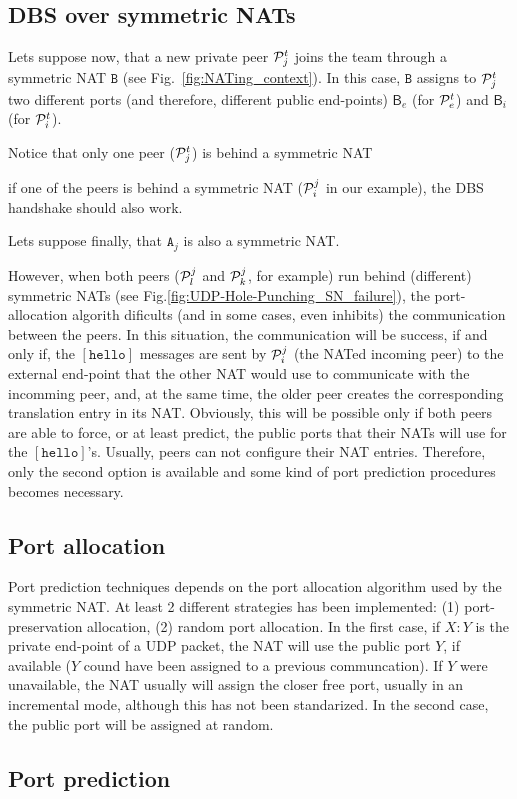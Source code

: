 




\subsection{DBS over symmetric NATs}


Lets suppose now, that a new private peer ${\cal P}^t_j$ joins the
team through a symmetric NAT $\mathtt{B}$ (see
Fig.~\ref{fig:NATing_context}). In this case, $\mathtt{B}$ assigns
to ${\cal P}^t_j$ two different ports (and therefore, different
public end-points) $\mathsf{B}_e$ (for ${\cal P}^t_e$) and
$\mathsf{B}_i$ (for ${\cal P}^t_i$).

Notice that only one peer (${\cal P}^t_j$) is behind a symmetric NAT

if one of the peers is
behind a symmetric NAT (${\cal P}^j_i$ in our example), the DBS
handshake should also work.

Lets suppose finally, that $\mathtt{A}_j$ is also a symmetric NAT.

 However, when both peers (${\cal P}^j_l$ and
${\cal P}^j_k$, for example) run behind (different) symmetric NATs
(see Fig.\ref{fig:UDP-Hole-Punching_SN_failure}), the port-allocation
algorith dificults (and in some cases, even inhibits) the
communication between the peers. In this situation, the communication
will be success, if and only if, the $[\mathtt{hello}]$ messages are
sent by ${\cal P}^j_i$ (the NATed incoming peer) to the external
end-point that the other NAT would use to communicate with the
incomming peer, and, at the same time, the older peer creates the
corresponding translation entry in its NAT. Obviously, this will be
possible only if both peers are able to force, or at least predict,
the public ports that their NATs will use for the
$[\mathtt{hello}]$'s. Usually, peers can not configure their NAT
entries. Therefore, only the second option is available and some kind
of port prediction procedures becomes necessary.

\subsection{Port allocation}
Port prediction techniques depends on the port allocation algorithm
used by the symmetric NAT. At least 2 different strategies has been
implemented: (1) port-preservation allocation, (2) random port
allocation. In the first case, if $X:Y$ is the private end-point of a
UDP packet, the NAT will use the public port $Y$, if available ($Y$
cound have been assigned to a previous communcation). If $Y$ were
unavailable, the NAT usually will assign the closer free port, usually
in an incremental mode, although this has not been standarized. In the
second case, the public port will be assigned at random.


\subsection{Port prediction}
